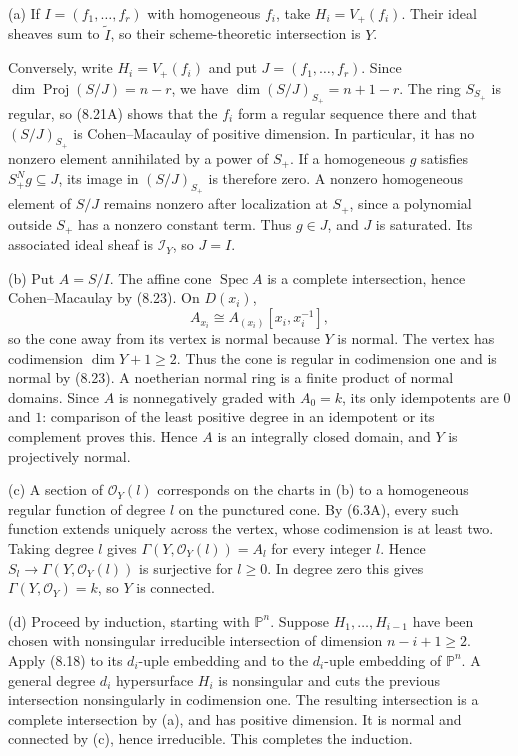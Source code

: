 (a) If $I=(f_1,\ldots,f_r)$ with homogeneous $f_i$, take $H_i=V_+(f_i)$. Their ideal sheaves sum to $\widetilde I$, so their scheme-theoretic intersection is $Y$.

Conversely, write $H_i=V_+(f_i)$ and put $J=(f_1,\ldots,f_r)$. Since $\dim\operatorname{Proj}(S/J)=n-r$, we have $\dim(S/J)_{S_+}=n+1-r$. The ring $S_{S_+}$ is regular, so (8.21A) shows that the $f_i$ form a regular sequence there and that $(S/J)_{S_+}$ is Cohen--Macaulay of positive dimension. In particular, it has no nonzero element annihilated by a power of $S_+$. If a homogeneous $g$ satisfies $S_+^N g\subseteq J$, its image in $(S/J)_{S_+}$ is therefore zero. A nonzero homogeneous element of $S/J$ remains nonzero after localization at $S_+$, since a polynomial outside $S_+$ has a nonzero constant term. Thus $g\in J$, and $J$ is saturated. Its associated ideal sheaf is $\mathcal I_Y$, so $J=I$.

(b) Put $A=S/I$. The affine cone $\operatorname{Spec}A$ is a complete intersection, hence Cohen--Macaulay by (8.23). On $D(x_i)$,
\[A_{x_i}\cong A_{(x_i)}[x_i,x_i^{-1}],\]
so the cone away from its vertex is normal because $Y$ is normal. The vertex has codimension $\dim Y+1\ge2$. Thus the cone is regular in codimension one and is normal by (8.23). A noetherian normal ring is a finite product of normal domains. Since $A$ is nonnegatively graded with $A_0=k$, its only idempotents are $0$ and $1$: comparison of the least positive degree in an idempotent or its complement proves this. Hence $A$ is an integrally closed domain, and $Y$ is projectively normal.

(c) A section of $\mathcal O_Y(l)$ corresponds on the charts in (b) to a homogeneous regular function of degree $l$ on the punctured cone. By (6.3A), every such function extends uniquely across the vertex, whose codimension is at least two. Taking degree $l$ gives $\Gamma(Y,\mathcal O_Y(l))=A_l$ for every integer $l$. Hence $S_l\to\Gamma(Y,\mathcal O_Y(l))$ is surjective for $l\ge0$. In degree zero this gives $\Gamma(Y,\mathcal O_Y)=k$, so $Y$ is connected.

(d) Proceed by induction, starting with $\mathbb P^n$. Suppose $H_1,\ldots,H_{i-1}$ have been chosen with nonsingular irreducible intersection of dimension $n-i+1\ge2$. Apply (8.18) to its $d_i$-uple embedding and to the $d_i$-uple embedding of $\mathbb P^n$. A general degree $d_i$ hypersurface $H_i$ is nonsingular and cuts the previous intersection nonsingularly in codimension one. The resulting intersection is a complete intersection by (a), and has positive dimension. It is normal and connected by (c), hence irreducible. This completes the induction.

